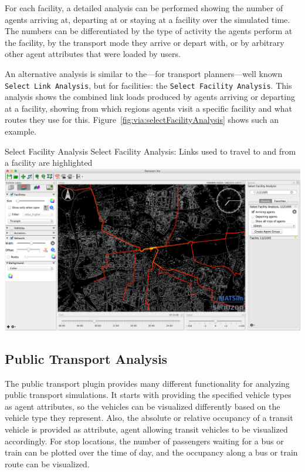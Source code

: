 For each facility, a detailed analysis can be performed showing the number of
agents arriving at, departing at or staying at a facility over the simulated
time. The numbers can be differentiated by the type of activity the agents
perform at the facility, by the transport mode they arrive or depart with, or by
arbitrary other agent attributes that were loaded by users.

An alternative analysis is similar to the---for transport planners---well known
\lstinline|Select Link Analysis|, but for facilities: the \lstinline|Select Facility Analysis|. This
analysis shows the combined link loads produced by agents arriving or departing
at a facility, showing from which regions agents visit a specific facility and
what routes they use for this. Figure~\ref{fig:via:selectFacilityAnalysis} shows
such an example.

\createfigure%
{Select Facility Analysis}%
{Select Facility Analysis: Links used to travel to and from a facility are highlighted}%
{\label{fig:via:selectFacilityAnalysis}}%
{\includegraphics[width=1.\textwidth,angle=0]{./extending/figures/via/selectFacilityAnalysis}}%
{}

\subsection{Public Transport Analysis}
The public transport plugin provides many different functionality for analyzing
public transport simulations. It starts with providing the specified vehicle
types as agent attributes, so the vehicles can be visualized differently based
on the vehicle type they represent. Also, the absolute or relative
occupancy of a transit vehicle is provided as attribute, agent allowing transit
vehicles to be visualized accordingly. For stop locations, the number of
passengers waiting for a bus or train can be plotted over the time of day, and
the occupancy along a bus or train route can be visualized.

